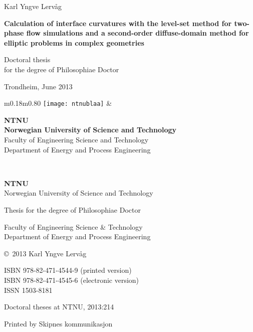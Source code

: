 \documentclass[11pt,b5paper,DIV=calc,BCOR1.3cm,headings=small,%
               footinclude=false,headsepline]{scrbook}
\begin{document}
\frontmatter

\begin{titlepage}
  \setlength{\parindent}{0cm}
  \addtolength{\parskip}{\baselineskip}
  {\large\sffamily Karl Yngve Lervåg}

  \vspace{2cm}%

  {\sffamily\large\bfseries Calculation of interface curvatures with the
    level-set method for two-phase flow simulations and a second-order
    diffuse-domain method for elliptic problems in complex geometries}

  \vfill

  {\large Doctoral thesis\\
    for the degree of Philosophiae Doctor

    Trondheim, June 2013}

  \vspace{2cm}

  \begin{tabular}{m{0.18\textwidth}m{0.80\textwidth}}
    \texttt{[image: ntnublaa]}
    & \parbox{\linewidth}{%
      {\Large\textbf{NTNU}}\\
      \textbf{Norwegian University of Science and Technology}\\
      Faculty of Engineering Science and Technology\\
      Department of Energy and Process Engineering}
  \end{tabular}

  \newpage
  \thispagestyle{empty}
  {~}
  \vfill
  {\scriptsize
    \textbf{NTNU}\\
    Norwegian University of Science and Technology

    Thesis for the degree of Philosophiae Doctor

    Faculty of Engineering Science \& Technology\\
    Department of Energy and Process Engineering

    \copyright\ 2013 Karl Yngve Lervåg

    ISBN 978-82-471-4544-9 (printed version)\\
    ISBN 978-82-471-4545-6 (electronic version)\\
    ISSN 1503-8181

    Doctoral theses at NTNU, 2013:214

    Printed by Skipnes kommunikasjon
  }
\end{titlepage}
\end{document}
